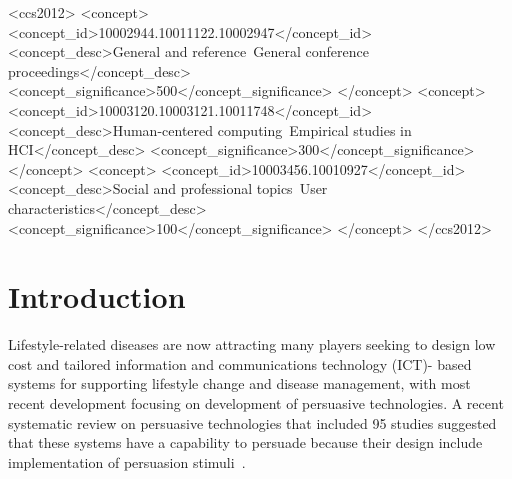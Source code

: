 \documentclass{sig-alternate}
\begin{document}
\begin{CCSXML}
<ccs2012>
<concept>
<concept_id>10002944.10011122.10002947</concept_id>
<concept_desc>General and reference~General conference proceedings</concept_desc>
<concept_significance>500</concept_significance>
</concept>
<concept>
<concept_id>10003120.10003121.10011748</concept_id>
<concept_desc>Human-centered computing~Empirical studies in HCI</concept_desc>
<concept_significance>300</concept_significance>
</concept>
<concept>
<concept_id>10003456.10010927</concept_id>
<concept_desc>Social and professional topics~User characteristics</concept_desc>
<concept_significance>100</concept_significance>
</concept>
</ccs2012>
\end{CCSXML}


%
%

%
%
\printccsdesc



\section{Introduction} 
Lifestyle-related diseases are now attracting many players seeking to design low cost and tailored information and communications technology (ICT)- based systems for supporting lifestyle change and disease management\cite{arsand:mobile}, with most recent development focusing on development of persuasive technologies. A recent systematic review on persuasive technologies that included 95 studies suggested that these systems have a capability to persuade because their design include implementation of persuasion stimuli~\cite{hamari2014persuasive}.
\end{document}
